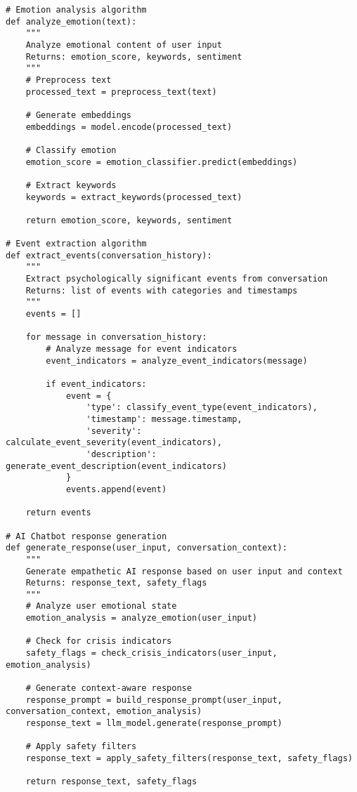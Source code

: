 \begin{verbatim}
# Emotion analysis algorithm
def analyze_emotion(text):
    """
    Analyze emotional content of user input
    Returns: emotion_score, keywords, sentiment
    """
    # Preprocess text
    processed_text = preprocess_text(text)
    
    # Generate embeddings
    embeddings = model.encode(processed_text)
    
    # Classify emotion
    emotion_score = emotion_classifier.predict(embeddings)
    
    # Extract keywords
    keywords = extract_keywords(processed_text)
    
    return emotion_score, keywords, sentiment

# Event extraction algorithm
def extract_events(conversation_history):
    """
    Extract psychologically significant events from conversation
    Returns: list of events with categories and timestamps
    """
    events = []
    
    for message in conversation_history:
        # Analyze message for event indicators
        event_indicators = analyze_event_indicators(message)
        
        if event_indicators:
            event = {
                'type': classify_event_type(event_indicators),
                'timestamp': message.timestamp,
                'severity': calculate_event_severity(event_indicators),
                'description': generate_event_description(event_indicators)
            }
            events.append(event)
    
    return events

# AI Chatbot response generation
def generate_response(user_input, conversation_context):
    """
    Generate empathetic AI response based on user input and context
    Returns: response_text, safety_flags
    """
    # Analyze user emotional state
    emotion_analysis = analyze_emotion(user_input)
    
    # Check for crisis indicators
    safety_flags = check_crisis_indicators(user_input, emotion_analysis)
    
    # Generate context-aware response
    response_prompt = build_response_prompt(user_input, conversation_context, emotion_analysis)
    response_text = llm_model.generate(response_prompt)
    
    # Apply safety filters
    response_text = apply_safety_filters(response_text, safety_flags)
    
    return response_text, safety_flags


\end{verbatim}
